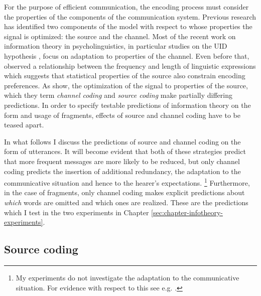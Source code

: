 For the purpose of efficient communication, the encoding process must consider the properties of the components of the communication system. Previous research has identified two components of the model with respect to whose properties the signal is optimized: the source and the channel. Most of the recent work on information theory in psycholinguistics, in particular studies on the UID hypothesis \citep{levy.jaeger2007}, focus on adaptation to properties of the channel. Even before that, \citet{zipf1935} observed a relationship between the frequency and length of linguistic expressions which suggests that statistical properties of the source also constrain encoding preferences. As \citet{pate.goldwater2015} show, the optimization of the signal to properties of the source, which they term \textit{channel coding} and \textit{source coding} make partially differing predictions. In order to specify testable predictions of information theory on the form and usage of fragments, effects of source and channel coding have to be teased apart. 

In what follows I discuss the predictions of source and channel coding on the form of utterances. It will become evident that both of these strategies predict that more frequent messages are more likely to be reduced, but only channel coding predicts the insertion of additional redundancy, the adaptation to the communicative situation and hence to the hearer's expectations.%
\footnote{My experiments do not investigate the adaptation to the communicative situation. For evidence with respect to this see e.g. \citet{pate.goldwater2015}.}\afterfn%
%
Furthermore, in the case of fragments, only channel coding makes explicit predictions about \textit{which} words are omitted and which ones are realized. These are the predictions which I test in the two experiments in Chapter \ref{sec:chapter-infotheory-experiments}.

\subsection{Source coding}
\label{sec:infotheory-zipf}

